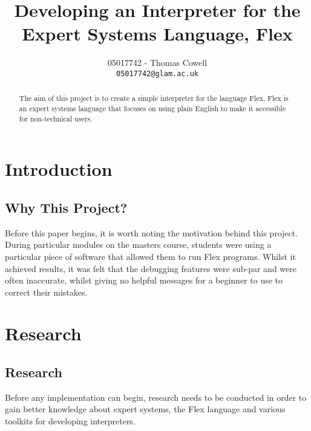 \documentclass[10pt]{report}
\begin{document}
\title{Developing an Interpreter for the Expert Systems Language, Flex}
\author{05017742 - Thomas Cowell\\
		\texttt{05017742@glam.ac.uk}}

\maketitle

\begin{abstract}
The aim of this project is to create a simple interpreter for the language Flex.  Flex is an expert systems language that focuses on using plain English to make it accessible for
non-technical users.
\end{abstract}

\pagestyle{plain}

\tableofcontents

\cleardoublepage
{}

\chapter{Introduction}

\section[Why This Project?]{Why This Project?}\label{sec:why_this_project}
Before this paper begins, it is worth noting the motivation behind this project.  During particular modules on the masters course, students were using a particular piece of software that allowed them to run Flex programs.  Whilst it achieved results, it was felt that the debugging features were sub-par and were often inaccurate, whilst giving no helpful messages for a beginner to use to correct their mistakes.

\chapter{Research}
\section[Research]{Research}\label{sec:intro_to_research}
Before any implementation can begin, research needs to be conducted in order to gain better knowledge about expert systems, the Flex language and various toolkits for developing interpreters.
\end{document}
